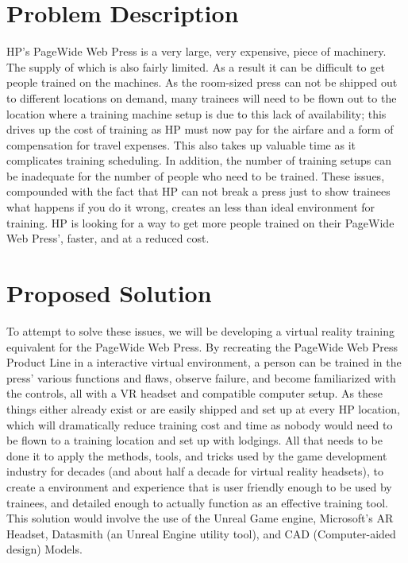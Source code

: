 \documentclass[onecolumn, draftclsnofoot,10pt, compsoc]{IEEEtran}
\begin{document}
\newpage
{}
\tableofcontents
\clearpage

\section{Problem Description}

HP's PageWide Web Press is a very large, very expensive, piece of machinery. The supply of which is also fairly limited. As a result it can be difficult to get people trained on the machines. As the room-sized press can not be shipped out to different locations on demand, many trainees will need to be flown out to the location where a training machine setup is due to this lack of availability; this drives up the cost of training as HP must now pay for the airfare and a form of compensation for travel expenses. This also takes up valuable time as it complicates training scheduling. In addition, the number of training setups can be inadequate for the number of people who need to be trained. These issues, compounded with the fact that HP can not break a press just to show trainees what happens if you do it wrong, creates an less than ideal environment for training. HP is looking for a way to get more people trained on their PageWide Web Press', faster, and at a reduced cost.     

\section{Proposed Solution}

To attempt to solve these issues, we will be developing a virtual reality training equivalent for the PageWide Web Press. By recreating the PageWide Web Press Product Line in a interactive virtual environment, a person can be trained in the press' various functions and flaws, observe failure, and become familiarized with the controls, all with a VR headset and compatible computer setup. As these things either already exist or are easily shipped and set up at every HP location, which will dramatically reduce training cost and time as nobody would need to be flown to a training location and set up with lodgings. All that needs to be done it to apply the methods, tools, and tricks used by the game development industry for decades (and about half a decade for virtual reality headsets), to create a environment and experience that is user friendly enough to be used by trainees, and detailed enough to actually function as an effective training tool. This solution would involve the use of the Unreal Game engine, Microsoft's AR Headset, Datasmith (an Unreal Engine utility tool), and CAD (Computer-aided design) Models.  
\end{document}
